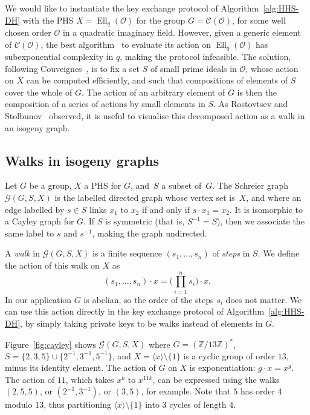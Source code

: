 \documentclass{llncs}
\newcommand{\Cl}{\mathcal{C}}
\newcommand{\Graph}{\mathcal{G}}
\renewcommand{\O}{\mathcal{O}}
\DeclareMathOperator{\Ell}{Ell}
\begin{document}
We would like to instantiate the key exchange protocol of
Algorithm~\ref{alg:HHS-DH} with the PHS
$X = \Ell_q(\O)$ for the group $G = \Cl(\O)$, 
for some well chosen order $\O$ in a quadratic imaginary field. 
However, given a generic element of $\Cl(\O)$, 
the best algorithm~\cite{jao+soukharev10} to evaluate
its action on $\Ell_q(\O)$ has subexponential complexity in $q$,
making the protocol infeasible. 
The solution,
following Couveignes~\cite{cryptoeprint:2006:291},
is to fix a set $S$ of small prime ideals in $\O$,
whose action on $X$ can be computed efficiently,
and such that compositions of elements of $S$
cover the whole of $G$.
The action of an arbitrary element of $G$
is then the composition of a series of actions by small elements in $S$.
As Rostovtsev and Stolbunov~\cite{rostovtsev+stolbunov06} observed,
it is useful to visualise this decomposed action
as a walk in an isogeny graph.


\subsection{Walks in isogeny graphs}

Let $G$ be a group,
$X$ a PHS for $G$,
and~$S$ a subset of~$G$.
The Schreier graph $\Graph(G,S,X)$
is the labelled directed graph whose vertex set is~$X$, 
and where an edge labelled by $s∈S$
links $x_1$ to $x_2$ if and only if $s\cdot x_1 = x_2$.
It is isomorphic to a Cayley graph for $G$.
If $S$ is symmetric (that is, $S^{-1}=S$), 
then we associate the same label to $s$ and $s^{-1}$, 
making the graph undirected. %

A \emph{walk} in $\Graph(G,S,X)$ is a finite sequence
$(s_1,\ldots,s_n)$ of \emph{steps} in $S$. 
We define the action of this walk on $X$ as
\[
    (s_1,\ldots,s_n)·x 
    = 
    \big(\prod_{i=1}^n s_i\big)·x.
\]
In our application $G$ is abelian,
so the order of the steps $s_i$ does not matter.
We can use this action directly in the key exchange protocol
of Algorithm~\ref{alg:HHS-DH},
by simply taking private keys to be walks instead of elements in $G$.

\begin{example}
Figure~\ref{fig:cayley}
shows $\Graph(G,S,X)$ where $G=(ℤ/13ℤ)^*$, 
$S = \{2,3,5\}\cup\{2^{-1},3^{-1},5^{-1}\}$,
and $X = \langle{x}\rangle\setminus\{1\}$ 
is a cyclic group of order $13$, minus its identity element.
The action of $G$ on $X$ is exponentiation: $g·x=x^g$.
The action of $11$, which takes $x^k$ to $x^{11k}$,
can be expressed using the walks 
$(2,5,5)$,
or $(2^{-1},3^{-1})$,
or $(3,5)$,
for example.  Note that $5$ has order $4$ modulo
$13$, thus partitioning $〈x〉\setminus\{1\}$ into $3$ cycles of
length $4$.
\end{example}
\end{document}
